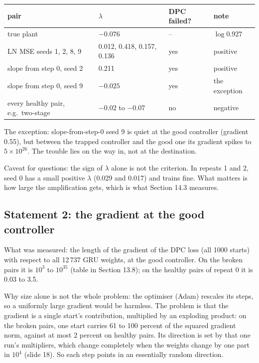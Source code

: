 \documentclass[11pt]{article}
\begin{document}
\begin{center}
\begin{tabular}{llll}
\toprule
pair & $\lambda$ & DPC failed? & note \\
\midrule
true plant & $-0.076$ & -- & $\log0.927$ \\
LN MSE seeds 1, 2, 8, 9 & 0.012, 0.418, 0.157, 0.136 & yes & positive \\
slope from step 0, seed 2 & 0.211 & yes & positive \\
slope from step 0, seed 9 & $-0.025$ & yes & the exception \\
every healthy pair, e.g.\ two-stage & $-0.02$ to $-0.07$ & no & negative \\
\bottomrule
\end{tabular}
\end{center}

The exception: slope-from-step-0 seed 9 is quiet at the good controller (gradient 0.55), but between the trapped controller and the good one its gradient spikes to $5\times10^{26}$. The trouble lies on the way in, not at the destination.

Caveat for questions: the sign of $\lambda$ alone is not the criterion. In repeats 1 and 2, seed 0 has a small positive $\lambda$ (0.029 and 0.017) and trains fine. What matters is how large the amplification gets, which is what Section 14.3 measures.

\subsection{Statement 2: the gradient at the good controller}

What was measured: the length of the gradient of the DPC loss (all 1000 starts) with respect to all 12\,737 GRU weights, at the good controller. On the broken pairs it is $10^3$ to $10^{35}$ (table in Section 13.8); on the healthy pairs of repeat 0 it is 0.03 to 3.5.

Why size alone is not the whole problem: the optimiser (Adam) rescales its steps, so a uniformly large gradient would be harmless. The problem is that the gradient is a single start's contribution, multiplied by an exploding product: on the broken pairs, one start carries 61 to 100 percent of the squared gradient norm, against at most 2 percent on healthy pairs. Its direction is set by that one run's multipliers, which change completely when the weights change by one part in $10^4$ (slide 18). So each step points in an essentially random direction.
\end{document}
